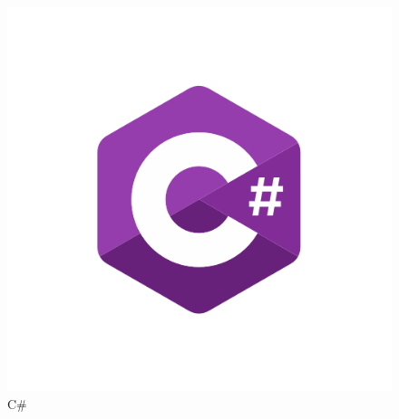 \documentclass[a4paper, titlepage]{article}
\begin{document}
    \begin{figure}
        \includegraphics[width=\textwidth]{csharp}
        \caption{C\#}
    \end{figure}

    \newpage
    \printbibliography
\end{document}
